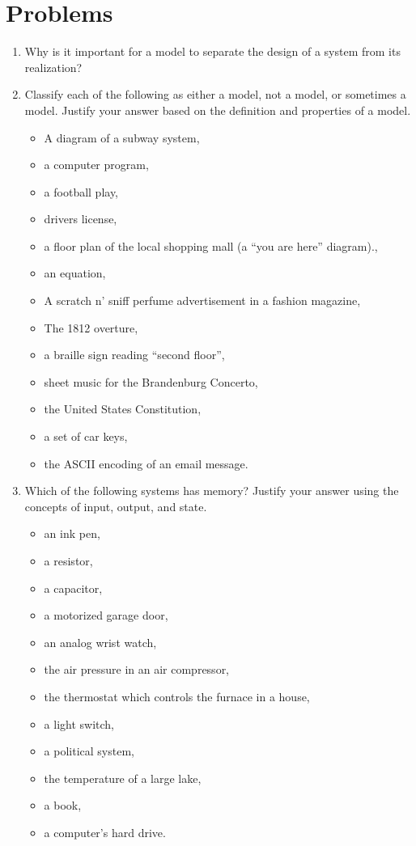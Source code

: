 \section{Problems}
\label{problems}

\begin{enumerate}
\def\labelenumi{\arabic{enumi}.}
\item
  Why is it important for a model to separate the design of a system
  from its realization?

\item
  Classify each of the following as either a model, not a model, or
  sometimes a model. Justify your answer based on the definition and
  properties of a model.

\begin{itemize}
\def\labelenumi{\alph{enumi})}
\item A diagram of a subway system,
\item a computer program, 
\item a football play, 
\item drivers license,
\item a floor plan of the local shopping mall (a ``you are here'' diagram)., 
\item an equation, 
\item A scratch n' sniff perfume advertisement in a fashion magazine,
\item The 1812 overture,
\item a braille sign reading ``second floor'',
\item sheet music for the Brandenburg Concerto, 
\item the United States Constitution, 
\item a set of car keys,
\item the ASCII encoding of an email message.
\end{itemize}


  \item
    Which of the following systems has memory? Justify your answer using
    the concepts of input, output, and state.
\begin{itemize}
\def\labelenumi{\alph{enumi})}
\item  an ink pen,
\item a resistor,
\item a capacitor,
\item a motorized garage door,
 \item an analog wrist watch, 
\item the air pressure in an air compressor, 
\item  the thermostat which controls the furnace in a house, 
\item a light switch, 
\item a political system,
\item the temperature of a large lake, 
\item  a book, 
\item a computer's hard drive.
\end{itemize}



\end{enumerate}
